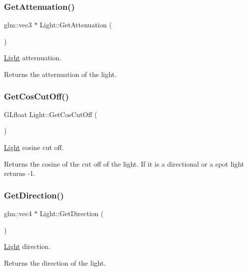 \subsubsection{\texorpdfstring{Get\+Attenuation()}{GetAttenuation()}}
{\footnotesize\ttfamily glm\+::vec3 $\ast$ Light\+::\+Get\+Attenuation (\begin{DoxyParamCaption}{ }\end{DoxyParamCaption})}



\hyperlink{class_light}{Light} atternuation. 

Returns the atternuation of the light. \mbox{\label{class_light_ad1ddee3ac2e66ee13e41544603587393}} 
\subsubsection{\texorpdfstring{Get\+Cos\+Cut\+Off()}{GetCosCutOff()}}
{\footnotesize\ttfamily G\+Lfloat Light\+::\+Get\+Cos\+Cut\+Off (\begin{DoxyParamCaption}{ }\end{DoxyParamCaption})}



\hyperlink{class_light}{Light} cosine cut off. 

Returns the cosine of the cut off of the light. If it is a directional or a spot light returns -\/1. \mbox{\label{class_light_a5373bb221bc648c203236d52b787416a}} 
\subsubsection{\texorpdfstring{Get\+Direction()}{GetDirection()}}
{\footnotesize\ttfamily glm\+::vec4 $\ast$ Light\+::\+Get\+Direction (\begin{DoxyParamCaption}{ }\end{DoxyParamCaption})}



\hyperlink{class_light}{Light} direction. 

Returns the direction of the light. \mbox{\label{class_light_a5ae42d0f1ff71f86b52ede3a37da455d}} 
